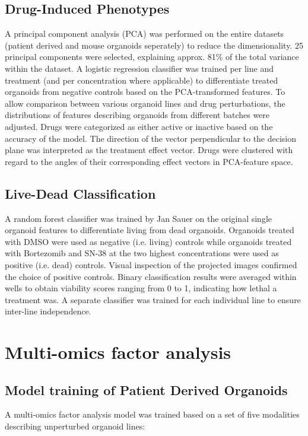 \begin{flushleft}
\subsection{Drug-Induced Phenotypes}
A principal component analysis (PCA) was performed on the entire datasets (patient derived and mouse organoids seperately) to reduce the dimensionality. 25 principal components were selected, explaining approx. 81\% of the total variance within the dataset. A logistic regression classifier was trained per line and treatment (and per concentration where applicable) to differentiate treated organoids from negative controls based on the PCA-transformed features. To allow comparison between various organoid lines and drug perturbations, the distributions of features describing organoids from different batches were adjusted. Drugs were categorized as either active or inactive based on the accuracy of the model. The direction of the vector perpendicular to the decision plane was interpreted as the treatment effect vector. Drugs were clustered with regard to the angles of their corresponding effect vectors in PCA-feature space.

\subsection{Live-Dead Classification}
A random forest classifier was trained by Jan Sauer on the original single organoid features to differentiate living from dead organoids. Organoids treated with DMSO were used as negative (i.e. living) controls while organoids treated with Bortezomib and SN-38 at the two highest concentrations were used as positive (i.e. dead) controls. Visual inspection of the projected images confirmed the choice of positive controls. Binary classification results were averaged within wells to obtain viability scores ranging from 0 to 1, indicating how lethal a treatment was. A separate classifier was trained for each individual line to ensure inter-line independence.


\section{Multi-omics factor analysis}
\subsection{Model training of Patient Derived Organoids}
A multi-omics factor analysis model \cite{Argelaguet2018-mz} was trained based on a set of five modalities describing unperturbed organoid lines:


\end{flushleft}
